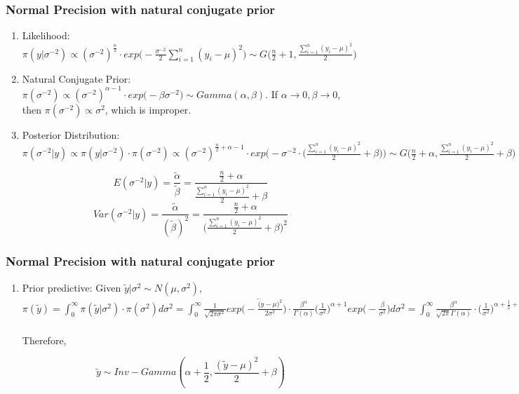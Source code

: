 \documentclass{beamer}
\begin{document}
\begin{frame}
\frametitle{Normal Precision with natural conjugate prior}

\begin{enumerate}
\item Likelihood: $\pi(y|\sigma^{-2}) \propto (\sigma^{-2})^{\frac{n}{2}} \cdot exp\Big(-\frac{\sigma^{-2}}{2}\sum_{i=1}^n(y_i-\mu)^2\Big) \sim G\Big(\frac{n}{2}+1, \frac{\sum_{i=1}^n(y_i-\mu)^2}{2}\Big)$

\item Natural Conjugate Prior: $\pi(\sigma^{-2}) \propto (\sigma^{-2})^{\alpha -1} \cdot exp\Big(-\beta\sigma^{-2}\Big) \sim Gamma(\alpha, \beta)$. If $\alpha \rightarrow 0, \beta \rightarrow 0$, then $\pi(\sigma^{-2}) \propto \sigma^2$, which is improper.

\item Posterior Distribution: $\pi(\sigma^{-2}|y) \propto \pi(y|\sigma^{-2}) \cdot \pi(\sigma^{-2}) \propto (\sigma^{-2})^{\frac{n}{2} + \alpha -1} \cdot exp\Big(-\sigma^{-2} \cdot \Big(\frac{\sum_{i=1}^n (y_i - \mu)^2}{2}+ \beta\Big)\Big) \sim G\Big(\frac{n}{2}+\alpha, \frac{\sum_{i=1}^n (y_i - \mu)^2}{2}+ \beta\Big)$

$$E(\sigma^{-2}|y) = \frac{\tilde \alpha}{\tilde \beta} = \frac{\frac{n}{2}+\alpha}{\frac{\sum_{i=1}^n (y_i - \mu)^2}{2}+ \beta}$$
$$Var(\sigma^{-2}|y) = \frac{\tilde \alpha}{(\tilde\beta)^2} = \frac{\frac{n}{2}+\alpha}{\Big(\frac{\sum_{i=1}^n (y_i - \mu)^2}{2}+ \beta\Big)^2}$$


\end{enumerate}

\end{frame}



\begin{frame}
\frametitle{Normal Precision with natural conjugate prior}

\begin{enumerate}
\item Prior predictive: Given $\tilde y|\sigma^2 \sim N(\mu,\sigma^2)$, $\pi(\tilde y) = \int_0^{\infty} \pi(\tilde y|\sigma^2) \cdot \pi(\sigma^2) d\sigma^2 = \int_0^{\infty} \frac{1}{\sqrt{2\pi \sigma^2}} exp\Big(-\frac{\tilde (y - \mu)^2}{2\sigma^2}\Big) \cdot \frac{\beta^{\alpha}}{\Gamma(\alpha)} \Big(\frac{1}{\sigma^2}\Big)^{\alpha + 1} exp\Big(-\frac{\beta}{\sigma^2}\Big) d\sigma^2 = \int_0^{\infty} \frac{\beta^{\alpha}}{\sqrt{2\pi}\Gamma(\alpha)} \cdot \Big(\frac{1}{\sigma^2}\Big)^{\alpha +\frac{1}{2} + 1} \cdot exp\Big(-\frac{1}{\sigma^2}\Big(\frac{(\tilde y - \mu)^2}{2} + \beta\Big)\Big) d\sigma^2 = \frac{\beta^{\alpha}}{\sqrt{2\pi}\Gamma(\alpha)} \cdot \frac{\Gamma(\alpha+\frac{1}{2})}{\Big(\frac{(\tilde y - \mu)^2}{2} + \beta\Big)^{\alpha+\frac{1}{2}}}$ 

Therefore,

$$\tilde y \sim Inv-Gamma(\alpha+\frac{1}{2}, \frac{(\tilde y - \mu)^2}{2} + \beta)$$

\end{enumerate}

\end{frame}
\end{document}
